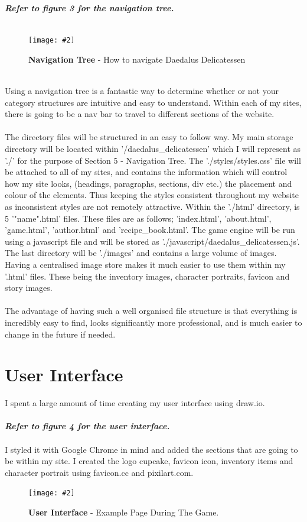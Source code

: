 \documentclass[10pt, a4paper]{article}
\newcommand{\figuremacro}[5]{
    \begin{figure}[#1]
        \centering
        \texttt{[image: \#2]}
        \caption[#3]{\textbf{#3}#4}
        \label{fig:#2}
    \end{figure}
}
\begin{document}
    \textbf{\textit{Refer to figure 3 for the navigation tree.}} \\
    \\
    \figuremacro{h}{NavigationTree}{Navigation Tree}{ - How to navigate Daedalus Delicatessen}{1.0} \\
    Using a navigation tree is a fantastic way to determine whether or not your category structures are intuitive and easy to understand. Within each of my sites, there is going to be a nav bar to travel to different sections of the website. \\
    \\
    The directory files will be structured in an easy to follow way. My main storage directory will be located within '/daedalus\_delicatessen' which I will represent as './' for the purpose of Section 5 - Navigation Tree. The './styles/styles.css' file will be attached to all of my sites, and contains the information which will control how my site looks, (headings, paragraphs, sections, div etc.) the placement and colour of the elements. Thus keeping the styles consistent throughout my website as inconsistent styles are not remotely attractive. Within the './html' directory, is 5 '"name".html' files. These files are as follows; 'index.html', 'about.html', 'game.html', 'author.html' and 'recipe\_book.html'. The game engine will be run using a javascript file and will be stored as './javascript/daedalus\_delicatessen.js'. The last directory will be './images' and contains a large volume of images. Having a centralised image store makes it much easier to use them within my '.html' files. These being the inventory images, character portraits, favicon and story images.\\
    \\
    The advantage of having such a well organised file structure is that everything is incredibly easy to find, looks significantly more professional, and is much easier to change in the future if needed.

    \section{User Interface}
    I spent a large amount of time creating my user interface using draw.io. \\
    \\
    \textbf{\textit{Refer to figure 4 for the user interface.}} \\
    \\
    I styled it with Google Chrome in mind and added the sections that are going to be within my site. I created the logo cupcake, favicon icon, inventory items and character portrait using favicon.cc and pixilart.com.
    \figuremacro{h}{interface}{User Interface}{ - Example Page During The Game.}{1.0}
\end{document}
